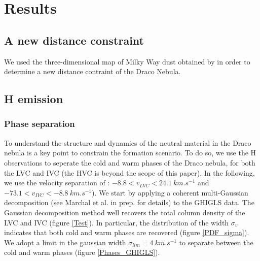 \documentclass[traditabstract]{aa}
\begin{document}
\section{Results}
\label{sec:Res}

   \subsection{A new distance constraint}

We used the three-dimensional map of Milky Way dust obtained by \cite{Green_2015ApJ...810...25G} in order to determine 
a new distance contraint of the Draco Nebula. 


   \subsection{H emission}
   \label{sec:HI-data}

      \subsubsection{Phase separation}

   To understand the structure and dynamics of the neutral material in the Draco nebula is a key point to constrain the formation scenario. To do so, we use the H observations to seperate the cold and warm phases of the Draco nebula, for both the LVC and IVC (the HVC is beyond the scope of this paper). In the following, we use the velocity separation of \cite{Planck_XXIV_2011}: $-8.8<v_{LVC}<24.1\: km.s^{-1}$ and $-73.1<v_{IVC}<-8.8\: km.s^{-1}$).
We start by applying a coherent multi-Gaussian decomposition (see Marchal et al. in prep. for details) to the GHIGLS data. The Gaussian decomposition method well recovers the total column density of the LVC and IVC (figure \ref{Test}). In particular, the distribution of the width $\sigma_v$ indicates that both cold and warm phases are recovered (figure \ref{PDF_sigma}). We adopt a limit in the gaussian width $\sigma_{lim}=4\: km.s^{-1}$ to separate between the
cold and warm phases (figure \ref{Phases_GHIGLS}).
\end{document}
